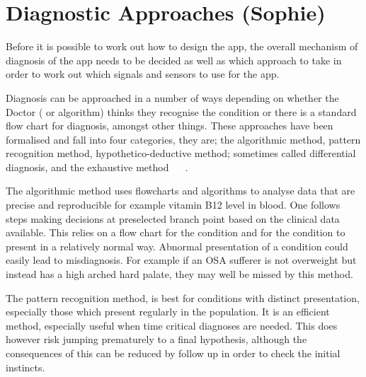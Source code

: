 \section{Diagnostic Approaches (Sophie)}
\label{sec:diagnosticMethods-sophie}
Before it is possible to work out how to design the app, the overall mechanism of diagnosis of the app needs to be decided as well as which approach to take in order to work out which signals and sensors to use for the app.

Diagnosis can be approached in a number of ways depending on whether the Doctor ( or algorithm) thinks they recognise the condition or there is a standard flow chart for diagnosis, amongst other things. These approaches have been formalised and fall into four categories, they are; the algorithmic method, pattern recognition method, hypothetico-deductive method; sometimes called differential diagnosis, and the exhaustive method ~\cite{ebpdiagnosticstrategies} ~\cite{mengel2002fundamentals}.

The algorithmic method uses flowcharts and algorithms to analyse data that are precise and reproducible for example vitamin B12 level in blood. One follows steps making decisions at preselected branch point based on the clinical data available. This relies on a flow chart for the condition and for the condition to present in a relatively normal way. Abnormal presentation of a condition could easily lead to misdiagnosis. For example if an OSA sufferer is not overweight but instead has a high arched hard palate, they may well be missed by this method. 

The pattern recognition method, is best for conditions with distinct presentation, especially those which present regularly in the population. It is an efficient method, especially useful when time critical diagnoses are needed. This does however risk jumping prematurely to a final hypothesis, although the consequences of this can be reduced by follow up in order to check the initial instincts. 

